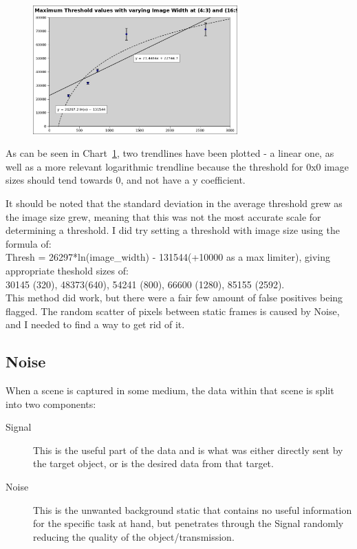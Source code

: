 \documentclass[11pt]{article} %
\begin{document}
{{\begin{figure}
	\vspace{-20pt}
	\begin{center}
		\includegraphics[width=0.7\textwidth]{../images/chart-threshold-with-varying-image}
	\end{center}
	\vspace{-15pt}
	\caption{}
	\label{chart:thresholds}
	\vspace{-10pt}
\end{figure}

As can be seen in Chart~\cref{chart:thresholds}, two trendlines have been plotted - a linear one, as well as a more relevant logarithmic trendline because the threshold for 0x0 image sizes should tend towards 0, and not have a y coefficient.

It should be noted that the standard deviation in the average threshold grew as the image size grew, meaning that this was not the most accurate scale for determining a threshold. I did try setting a threshold with image size using the formula of:\\
Thresh = 26297*ln(image\_width) - 131544(+10000 as a max limiter),  giving appropriate theshold sizes of:\\
30145 (320), 48373(640), 54241 (800), 66600 (1280), 85155 (2592).\\
This method did work, but there were a fair few amount of false positives being flagged.
The random scatter of pixels between static frames is caused by Noise, and I needed to find a way to get rid of it.

\subsection{Noise}

When a scene is captured in some medium, the data within that scene is split into two components:
\begin{description}
\item [Signal] This is the useful part of the data and is what was either directly sent by the target object, or is the desired data from that target.
\item [Noise] This is the unwanted background static that contains no useful information for the specific task at hand, but penetrates through the Signal randomly reducing the quality of the object/transmission.
\end{description}

}}
\end{document}
